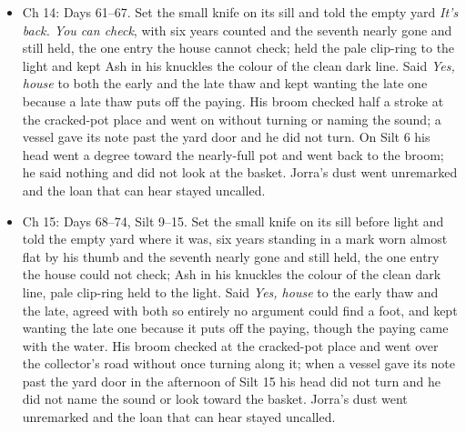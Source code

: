 \documentclass{design/chronicle}
\begin{document}
{\begin{itemize}[leftmargin=1.4em,itemsep=1pt,topsep=3pt,parsep=0pt]
\item Ch 14: Days 61–67. Set the small knife on its sill and told the empty yard \emph{It’s back. You can check}, with six years counted and the seventh nearly gone and still held, the one entry the house cannot check; held the pale clip-ring to the light and kept Ash in his knuckles the colour of the clean dark line. Said \emph{Yes, house} to both the early and the late thaw and kept wanting the late one because a late thaw puts off the paying. His broom checked half a stroke at the cracked-pot place and went on without turning or naming the sound; a vessel gave its note past the yard door and he did not turn. On Silt 6 his head went a degree toward the nearly-full pot and went back to the broom; he said nothing and did not look at the basket. Jorra’s dust went unremarked and the loan that can hear stayed uncalled.

\end{itemize}

\begin{itemize}[leftmargin=1.4em,itemsep=1pt,topsep=3pt,parsep=0pt]

\item Ch 15: Days 68–74, Silt 9–15. Set the small knife on its sill before light and told the empty yard where it was, six years standing in a mark worn almost flat by his thumb and the seventh nearly gone and still held, the one entry the house could not check; Ash in his knuckles the colour of the clean dark line, pale clip-ring held to the light. Said \emph{Yes, house} to the early thaw and the late, agreed with both so entirely no argument could find a foot, and kept wanting the late one because it puts off the paying, though the paying came with the water. His broom checked at the cracked-pot place and went over the collector’s road without once turning along it; when a vessel gave its note past the yard door in the afternoon of Silt 15 his head did not turn and he did not name the sound or look toward the basket. Jorra’s dust went unremarked and the loan that can hear stayed uncalled.

\end{itemize}

\begin{itemize}[leftmargin=1.4em,itemsep=1pt,topsep=3pt,parsep=0pt]


\end{itemize}}
\end{document}
